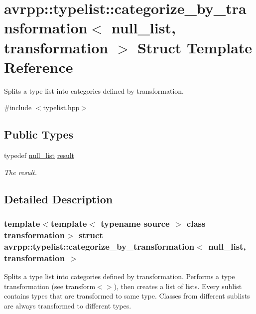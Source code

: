 \hypertarget{structavrpp_1_1typelist_1_1categorize__by__transformation_3_01null__list_00_01transformation_01_4}{
\section{avrpp::typelist::categorize\_\-by\_\-transformation$<$ null\_\-list, transformation $>$ Struct Template Reference}
\label{structavrpp_1_1typelist_1_1categorize__by__transformation_3_01null__list_00_01transformation_01_4}
}


Splits a type list into categories defined by transformation.  




{\ttfamily \#include $<$typelist.hpp$>$}

\subsection*{Public Types}
\begin{DoxyCompactItemize}
\item 
typedef \hyperlink{structavrpp_1_1typelist_1_1null__list}{null\_\-list} \hyperlink{structavrpp_1_1typelist_1_1categorize__by__transformation_3_01null__list_00_01transformation_01_4_aa24f5fa0d3249e06fb4bdab27866a100}{result}
\begin{DoxyCompactList}\small\item\em The result. \item\end{DoxyCompactList}\end{DoxyCompactItemize}


\subsection{Detailed Description}
\subsubsection*{template$<$template$<$ typename source $>$ class transformation$>$ struct avrpp::typelist::categorize\_\-by\_\-transformation$<$ null\_\-list, transformation $>$}

Splits a type list into categories defined by transformation. Performs a type transformation (see transform$<$$>$), then creates a list of lists. Every sublist contains types that are transformed to same type. Classes from different sublists are always transformed to different types.


